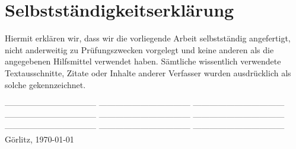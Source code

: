 \documentclass[
    11pt,               %
    a4paper,            %
    headsepline,        %
    foodsepline,        %
    cleardoubleplain,   %
    liststotoc,         %
    bibtotoc,           %
]%
{article}
\begin{document}
\pagestyle{empty}


\tableofcontents
\thispagestyle{empty}

\newpage
\pagestyle{empty}
\listoffigures

\newpage
\listoftables

\newpage
\pagestyle{plain}
\setcounter{section}{0}







\renewcommand{\baselinestretch}{1.13}\normalsize
{}
\renewcommand{\bibname}{BIBLIOGRAPHY}


\cleardoublepage

\section*{Selbstständigkeitserklärung}
\thispagestyle{empty} Hiermit erklären wir, dass wir die vorliegende
Arbeit selbstständig angefertigt, nicht anderweitig zu
Prüfungszwecken vorgelegt und keine anderen als die angegebenen
Hilfsmittel verwendet haben. Sämtliche wissentlich verwendete
Textausschnitte, Zitate oder Inhalte anderer Verfasser
wurden ausdrücklich als solche gekennzeichnet.%

\vspace{2cm}\noindent
\vspace{1cm}\noindent
--------------------------------- \newline
\vspace{1cm}\noindent
--------------------------------- \newline
\vspace{1cm}\noindent
--------------------------------- \newline
\vspace{1cm}\noindent
--------------------------------- \newline
\vspace{1cm}\noindent
--------------------------------- \newline
\vspace{1cm}\noindent
--------------------------------- \newline
\vspace{1cm}\noindent
--------------------------------- \newline
\vspace{1cm}\noindent
--------------------------------- \newline
\vspace{1cm}\noindent
--------------------------------- \newline
Görlitz, \today
\end{document}
